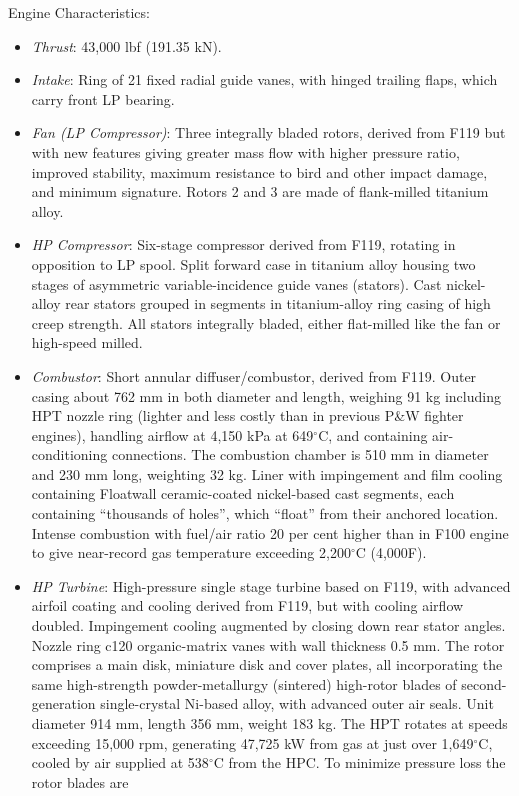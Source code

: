 Engine Characteristics: 
\begin{itemize}[noitemsep=2pt,topsep=0pt]
 \item {\it Thrust}: 43,000 lbf (191.35 kN).
 \item {\it Intake}: Ring of 21 fixed radial guide vanes, with hinged trailing flaps, which carry front LP bearing.
 \item {\it Fan (LP Compressor)}: Three integrally bladed rotors, derived from F119 but with new features giving greater mass flow with higher pressure ratio, improved stability, maximum resistance to bird and other impact damage, and minimum signature. Rotors 2 and 3 are made of  flank-milled titanium alloy.
 \item {\it  HP Compressor}: Six-stage compressor derived from F119, rotating in opposition to LP spool. Split forward case in titanium alloy housing two stages of asymmetric variable-incidence guide vanes (stators). Cast nickel-alloy rear stators grouped in segments in titanium-alloy ring casing of high creep strength. All stators integrally bladed, either flat-milled like the fan or high-speed milled.
 \item {\it  Combustor}: Short annular diffuser/combustor, derived from F119. Outer casing about 762 mm in both diameter and length, weighing 91 kg  including HPT nozzle ring (lighter and less costly than in previous P\&W fighter engines), handling airflow at 4,150 kPa  at 649$^\circ$C, and containing air-conditioning connections. The combustion chamber is 510 mm in diameter and 230 mm long, weighting 32 kg. Liner with impingement and film cooling containing Floatwall ceramic-coated nickel-based cast segments, each containing ``thousands of holes'', which ``float'' from their anchored location. Intense combustion with fuel/air ratio 20 per cent higher than in F100 engine to give near-record gas temperature exceeding 2,200$^\circ$C (4,000F).
 \item {\it  HP Turbine}: High-pressure single stage turbine based on F119, with advanced airfoil coating and cooling derived from F119, but with cooling airflow doubled. Impingement cooling augmented by closing down rear stator angles. Nozzle ring c120 organic-matrix vanes with wall thickness 0.5 mm. The rotor comprises a main disk, miniature disk and cover plates, all incorporating the same high-strength powder-metallurgy (sintered) high-rotor blades of second-generation single-crystal Ni-based alloy, with advanced outer air
seals. Unit diameter 914 mm, length 356 mm, weight 183 kg. The HPT rotates at speeds exceeding 15,000 rpm, generating 47,725 kW from gas at just over 1,649$^\circ$C, cooled by air supplied at 538$^\circ$C from the HPC. To minimize pressure loss the rotor blades are

\end{itemize}
